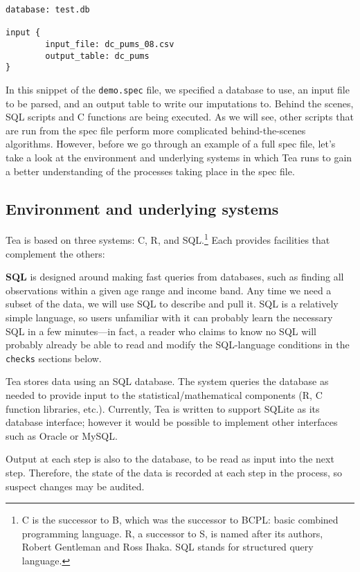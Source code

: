 \documentclass{article}
\begin{document}
\begin{verbatim}
database: test.db

input {
        input_file: dc_pums_08.csv
        output_table: dc_pums
}
\end{verbatim}

In this snippet of the {\tt demo.spec} file, we specified a database to use, an input 
file to be parsed, and an output table to write our imputations to. Behind the scenes, 
SQL scripts and C functions are being executed. As we will see, other scripts that are 
run from the spec file perform more complicated behind-the-scenes algorithms. 
However, before we go through an example of a full spec file, let's take a look at 
the environment and underlying systems in which Tea runs to gain a better understanding 
of the processes taking place in the spec file.

\subsection{Environment and underlying systems}
Tea is based on three systems: C, R, and SQL.\footnote{C is the successor to B, which
was the successor to BCPL: basic combined programming language. R, a successor to S,
is named after its authors, Robert Gentleman and Ross Ihaka. SQL stands for structured
query language.} Each provides facilities that complement the others:

{\bf SQL} is designed around making fast queries from databases, such as finding all
observations within a given age range and income band. Any time we need a subset of the
data, we will use SQL to describe and pull it. SQL is a relatively simple language, so
users unfamiliar with it can probably learn the necessary SQL in a few
minutes---in fact, a reader who claims to know no SQL will probably already be able
to read and modify the SQL-language conditions in the {\tt checks} sections below.

Tea stores data using an SQL database. The system queries the database as
needed to provide input to the statistical/mathematical components (R, C function libraries, etc.).
Currently, Tea is written to support SQLite as its database interface; however it would
be possible to implement other interfaces such as Oracle or MySQL.

Output at each step is also to the database, to be read as input into the next
step. Therefore, the state of the data is recorded at each step in the process, so
suspect changes may be audited.
\end{document}
